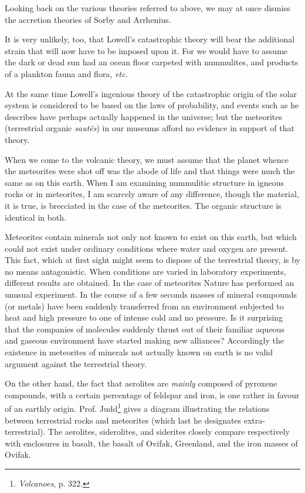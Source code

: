 \documentclass[a4paper, 12pt, oneside, landscape]{article}
\begin{document}
Looking back on the various theories referred to above, we may at once dismiss the accretion theories of Sorby and Arrhenius.

It is very unlikely, too, that Lowell's catastrophic theory will bear the additional strain that will now have to be imposed upon it. For we would have to assume the dark or dead sun had an ocean floor carpeted with nummulites, and products of a plankton fauna and flora, \emph{etc.}

At the same time Lowell's ingenious theory of the catastrophic origin of the solar system is considered to be based on the laws of probability, and events such as he describes have perhaps actually happened in the universe; but the meteorites (terrestrial organic \emph{sautés}) in our museums afford no evidence in support of that theory.

When we come to the volcanic theory, we must assume that the planet whence the meteorites were shot off was the abode of life and that things were much the same as on this earth. When I am examining nummulitic structure in igneous rocks or in meteorites, I am scarcely aware of any difference, though the material, it is true, is brecciated in the case of the meteorites. The organic structure is identical in both.

Meteorites contain minerals not only not known to exist on this earth, but which could not exist under ordinary conditions where water and oxygen are present. This fact, which at first sight might seem to dispose of the terrestrial theory, is by no means antagonistic. When conditions are varied in laboratory experiments, different results are obtained. In the case of meteorites Nature has performed an unusual experiment. In the course of a few seconds masses of mineral compounds (or metals) have been suddenly transferred from an environment subjected to heat and high pressure to one of intense cold and no pressure. Is it surprising that the companies of molecules suddenly thrust out of their familiar aqueous and gaseous environment have started making new alliances? Accordingly the existence in meteorites of minerals not actually known on earth is no valid argument against the terrestrial theory.

On the other hand, the fact that aerolites are \emph{mainly} composed of pyroxene compounds, with a certain percentage of feldspar and iron, is one rather in favour of an earthly origin. Prof. Judd\footnote{\emph{Volcanoes}, p. 322.} gives a diagram illustrating the relations between terrestrial rocks and meteorites (which last he designates extra-terrestrial). The aerolites, siderolites, and siderites closely compare respectively with enclosures in basalt, the basalt of Ovifak, Greenland, and the iron masses of Ovifak.
\end{document}
